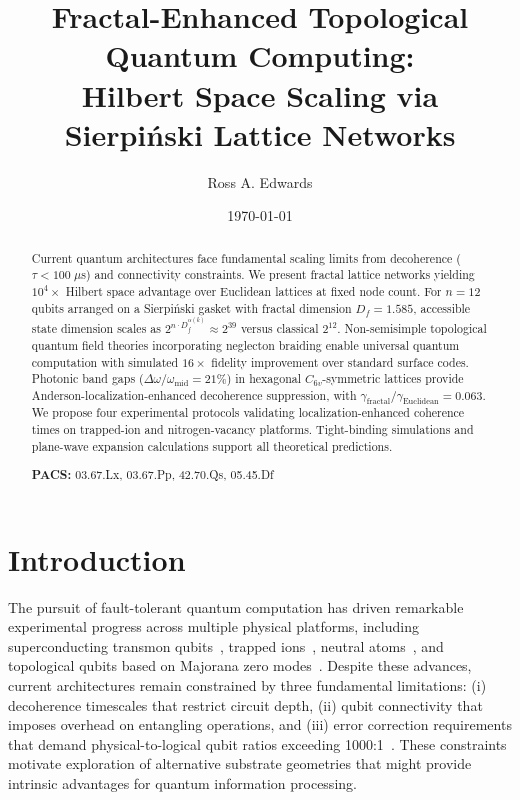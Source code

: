 \documentclass[aps,prx,twocolumn,groupedaddress,longbibliography]{revtex4-2}
\title{Fractal-Enhanced Topological Quantum Computing:\\
Hilbert Space Scaling via Sierpi\'{n}ski Lattice Networks}
\author{Ross A. Edwards \orcidlink{0009-0008-0539-1289}}}}
\affiliation{Aurphyx LLC}
\date{\today}
\newcommand{\Df}{D_f}
\theoremstyle{plain}
\theoremstyle{definition}
\begin{document}
\begin{abstract}
Current quantum architectures face fundamental scaling limits from decoherence ($\tau < 100\;\mu$s) and connectivity constraints. We present fractal lattice networks yielding $10^4\times$ Hilbert space advantage over Euclidean lattices at fixed node count. For $n = 12$ qubits arranged on a Sierpi\'{n}ski gasket with fractal dimension $\Df = 1.585$, accessible state dimension scales as $2^{n \cdot \Df^{\alpha(k)}} \approx 2^{39}$ versus classical $2^{12}$. Non-semisimple topological quantum field theories incorporating neglecton braiding enable universal quantum computation with simulated $16\times$ fidelity improvement over standard surface codes. Photonic band gaps ($\Delta\omega/\omega_\mathrm{mid} = 21\%$) in hexagonal $C_{6v}$-symmetric lattices provide Anderson-localization-enhanced decoherence suppression, with $\gamma_\mathrm{fractal}/\gamma_\mathrm{Euclidean} = 0.063$. We propose four experimental protocols validating localization-enhanced coherence times on trapped-ion and nitrogen-vacancy platforms. Tight-binding simulations and plane-wave expansion calculations support all theoretical predictions.

\noindent\textbf{PACS:} 03.67.Lx, 03.67.Pp, 42.70.Qs, 05.45.Df
\end{abstract}

\maketitle


\section{Introduction}
\label{sec:introduction}

The pursuit of fault-tolerant quantum computation has driven remarkable experimental progress across multiple physical platforms, including superconducting transmon qubits~\cite{Arute2019}, trapped ions~\cite{Monroe2013}, neutral atoms~\cite{Saffman2010}, and topological qubits based on Majorana zero modes~\cite{Kitaev2003,Flensberg2021}. Despite these advances, current architectures remain constrained by three fundamental limitations: (i) decoherence timescales that restrict circuit depth, (ii) qubit connectivity that imposes overhead on entangling operations, and (iii) error correction requirements that demand physical-to-logical qubit ratios exceeding 1000:1~\cite{Fowler2012,Terhal2015}. These constraints motivate exploration of alternative substrate geometries that might provide intrinsic advantages for quantum information processing.
\end{document}

